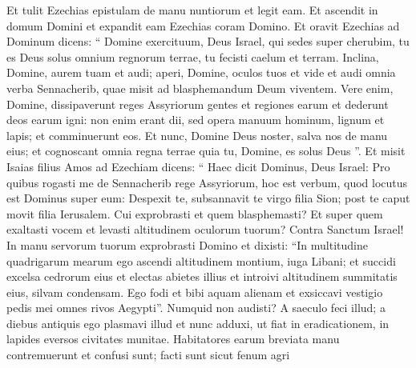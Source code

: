 \begin{biblechapter}
\begin{biblechapter}
\begin{biblechapter}
\begin{biblechapter}
\begin{biblechapter}
\begin{biblechapter}
\begin{biblechapter}
\begin{biblechapter}
\begin{biblechapter}
\begin{biblechapter}
\begin{biblechapter}
\begin{biblechapter}
\begin{biblechapter}
\begin{biblechapter}
\begin{biblechapter}
\begin{biblechapter}
\begin{biblechapter}
\begin{biblechapter}
\begin{biblechapter}
\begin{biblechapter}
\begin{biblechapter}
\begin{biblechapter}
\begin{biblechapter}
\begin{biblechapter}
\begin{biblechapter}
\begin{biblechapter}
\begin{biblechapter}
\begin{biblechapter}
\begin{biblechapter}
\begin{biblechapter}
\begin{biblechapter}
\begin{biblechapter}
\begin{biblechapter}
\begin{biblechapter}
\begin{biblechapter}
\begin{biblechapter}
\begin{biblechapter}
 \verse Et tulit Ezechias epistulam de manu nuntiorum et legit eam. Et ascendit in domum Domini et expandit eam Ezechias coram Domino.
 \verse Et oravit Ezechias ad Dominum dicens:
 \verse “ Domine exercituum, Deus Israel, qui sedes super cherubim, tu es Deus solus omnium regnorum terrae, tu fecisti caelum et terram. 
\verse Inclina, Domine, aurem tuam et audi; aperi, Domine, oculos tuos et vide et audi omnia verba Sennacherib, quae misit ad blasphemandum Deum viventem. 
\verse Vere enim, Domine, dissipaverunt reges Assyriorum gentes et regiones earum 
\verse et dederunt deos earum igni: non enim erant dii, sed opera manuum hominum, lignum et lapis; et comminuerunt eos. 
\verse Et nunc, Domine Deus noster, salva nos de manu eius; et cognoscant omnia regna terrae quia tu, Domine, es solus Deus ”.
 \verse Et misit Isaias filius Amos ad Ezechiam dicens: “ Haec dicit Dominus, Deus Israel: Pro quibus rogasti me de Sennacherib rege Assyriorum, 
\verse hoc est verbum, quod locutus est Dominus super eum:
 Despexit te, subsannavit te virgo filia Sion;
 post te caput movit filia Ierusalem.
 \verse Cui exprobrasti et quem blasphemasti?
 Et super quem exaltasti vocem
 et levasti altitudinem oculorum tuorum?
 Contra Sanctum Israel!
 \verse In manu servorum tuorum exprobrasti Domino
 et dixisti: “In multitudine quadrigarum mearum
 ego ascendi altitudinem montium, iuga Libani;
 et succidi excelsa cedrorum eius
 et electas abietes illius
 et introivi altitudinem summitatis eius,
 silvam condensam.
 \verse Ego fodi et bibi aquam alienam
 et exsiccavi vestigio pedis mei
 omnes rivos Aegypti”.
 \verse Numquid non audisti?
 A saeculo feci illud; a diebus antiquis
 ego plasmavi illud et nunc adduxi,
 ut fiat in eradicationem,
 in lapides eversos civitates munitae.
 \verse Habitatores earum breviata manu
 contremuerunt et confusi sunt;
 facti sunt sicut fenum agri

\end{biblechapter}
\end{biblechapter}
\end{biblechapter}
\end{biblechapter}
\end{biblechapter}
\end{biblechapter}
\end{biblechapter}
\end{biblechapter}
\end{biblechapter}
\end{biblechapter}
\end{biblechapter}
\end{biblechapter}
\end{biblechapter}
\end{biblechapter}
\end{biblechapter}
\end{biblechapter}
\end{biblechapter}
\end{biblechapter}
\end{biblechapter}
\end{biblechapter}
\end{biblechapter}
\end{biblechapter}
\end{biblechapter}
\end{biblechapter}
\end{biblechapter}
\end{biblechapter}
\end{biblechapter}
\end{biblechapter}
\end{biblechapter}
\end{biblechapter}
\end{biblechapter}
\end{biblechapter}
\end{biblechapter}
\end{biblechapter}
\end{biblechapter}
\end{biblechapter}
\end{biblechapter}
